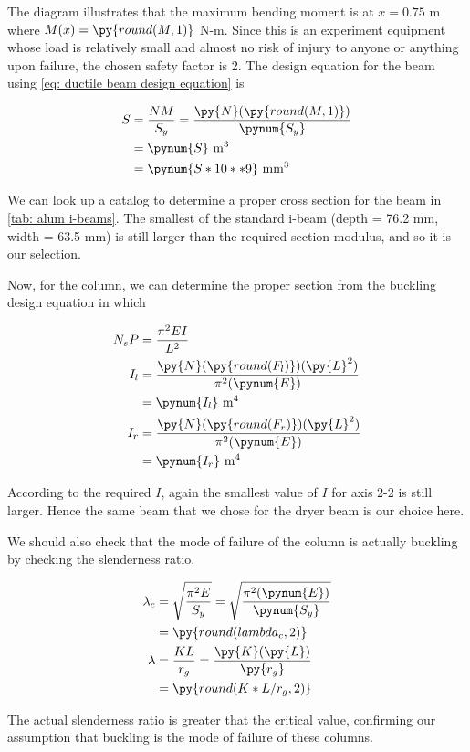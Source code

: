 \documentclass[
10pt,
a4paper,
openany,
svgnames,
]{book}
\begin{document}
\begin{solution}
  The diagram illustrates that the maximum bending moment is at $x = 0.75$ m where $M(x) = \py{round(M,1)}$ N-m. Since this is an experiment equipment whose load is relatively small and almost no risk of injury to anyone or anything upon failure, the chosen safety factor is 2. The design equation for the beam using \cref{eq: ductile beam design equation} is

  \begin{align*}
    S &= \frac{N M}{S_y} = \frac{\py{N}(\py{round(M,1)})}{\pynum{S_y}} \\
      &= \pynum{S} \text{ m}^3 \\
      &= \pynum{S*10**9} \text{ mm}^3
  \end{align*}

  We can look up a catalog to determine a proper cross section for the beam in \cref{tab: alum i-beams}. The smallest of the standard i-beam (depth = 76.2 mm, width = 63.5 mm) is still larger than the required section modulus, and so it is our selection.

  Now, for the column, we can determine the proper section from the buckling design equation in which

  \begin{align*}
    N_s P &= \frac{\pi^2 EI}{L^2} \\
    I_l &= \frac{\py{N}(\py{round(F_l)})(\py{L}^2)}{\pi^2 (\pynum{E})} \\
          &= \pynum{I_l} \text{ m}^4 \\
    I_r &= \frac{\py{N}(\py{round(F_r)})(\py{L}^2)}{\pi^2 (\pynum{E})} \\
          &= \pynum{I_r} \text{ m}^4
  \end{align*}

  According to the required $I$, again the smallest value of $I$ for axis 2-2 is still larger. Hence the same beam that we chose for the dryer beam is our choice here.

  We should also check that the mode of failure of the column is actually buckling by checking the slenderness ratio.

  \begin{align*}
    \lambda_c &= \sqrt{ \frac{ \pi^2 E }{S_y}} = \sqrt{ \frac{ \pi^2 (\pynum{E})}{\pynum{S_y}}} \\
              &= \py{round(lambda_c,2)} \\
    \lambda &= \frac{KL}{r_g} = \frac{\py{K}(\py{L})}{\py{r_g}} \\
              &= \py{round(K*L/r_g,2)}
  \end{align*}

  The actual slenderness ratio is greater that the critical value, confirming our assumption that buckling is the mode of failure of these columns.
\end{solution}
\end{document}
